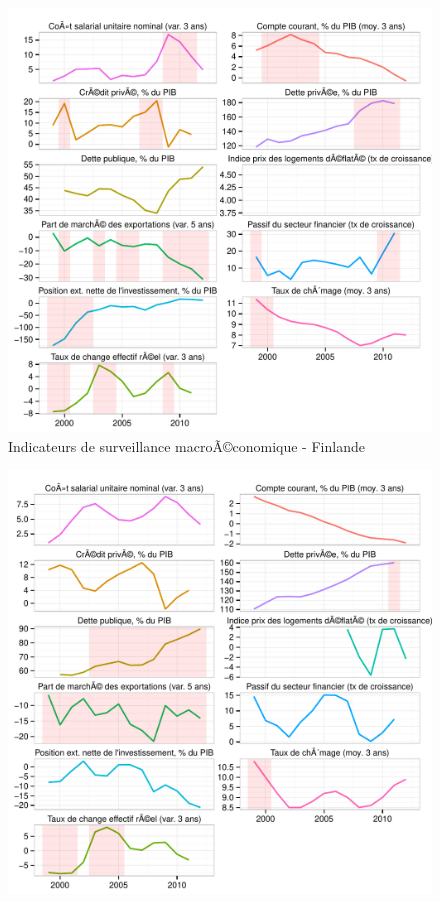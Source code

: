 \documentclass{article}\usepackage[]{graphicx}\usepackage[]{color}
\makeatletter
\def\maxwidth{ %
  \ifdim\Gin@nat@width>\linewidth
    \linewidth
  \else
    \Gin@nat@width
  \fi
}
\newenvironment{knitrout}{}{} %
\makeatother
\begin{document}
\begin{knitrout}
\begin{figure}[p]
{\centering \includegraphics[width=\maxwidth]{figure_graph/byco11} 

}

\caption[Indicateurs de surveillance macroÃ©conomique - Finlande]{Indicateurs de surveillance macroÃ©conomique - Finlande\label{fig:byco11}}
\end{figure}

\begin{figure}[p]


{\centering \includegraphics[width=\maxwidth]{figure_graph/byco12} 

}
\end{figure}
\end{knitrout}
\end{document}
